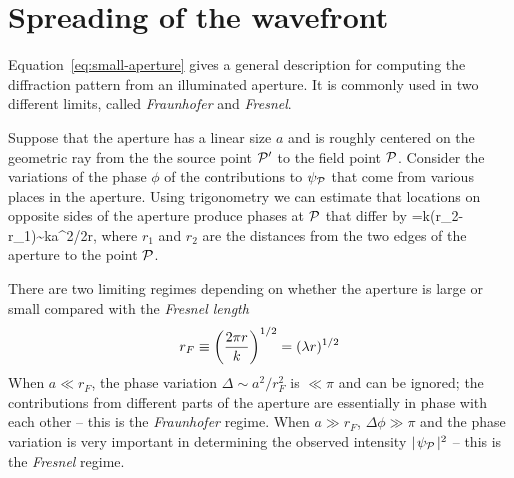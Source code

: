 \section{Spreading of the wavefront}

Equation~\ref{eq:small-aperture} gives a general description for computing the diffraction 
pattern from an illuminated aperture. It is commonly used in two different limits, called
{\it Fraunhofer} and {\it Fresnel}.

Suppose that the aperture has a linear size $a$ and is roughly centered on the geometric ray
from the the source point ${\cal P}'$ to the field point ${\cal P}$. Consider the variations of 
the phase $\phi$ of the contributions to $\psi_{\cal P}$ that come from various places in the
aperture. Using trigonometry we can estimate that locations on opposite sides of the aperture
produce phases at ${\cal P}$ that differ by
\be
\Delta\phi=k(r_2-r_1)\sim {ka^2/2r},
\label{eq:exercise-3-eq}
\ee
where $r_1$ and $r_2$ are the distances from the two edges of the aperture to the point ${\cal P}$. 



There are
two limiting regimes depending on whether the aperture is large or small compared with the 
{\it Fresnel length}
\[
r_{F}\equiv\left({2\pi r\over k}\right)^{1/2}=(\lambda r)^{1/2}
\]
When $a\ll r_{F}$, the phase variation $\Delta\sim {a^2/r_{F}^2}$ is $\ll \pi$ and can be 
ignored; the contributions from different parts of the aperture are essentially in phase with
each other -- this is the {\it Fraunhofer} regime. When $a\gg r_{F}$, $\Delta\phi\gg \pi$ and the 
phase variation is very important in determining the observed intensity 
$\mid\!\psi_{\cal P}\!\mid^2$ -- this is the {\it Fresnel} regime.

